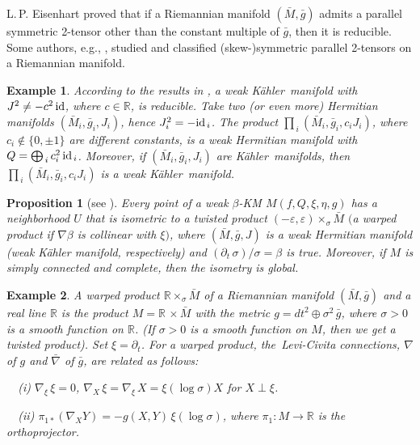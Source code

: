 \documentclass[11pt,a4paper,twoside]{article}
\newtheorem{example}{Example}%
\newtheorem{proposition}{Proposition}%
\begin{document}
{L.\,P. Eisenhart \cite{E-1923} proved that if a Riemannian manifold $(\bar M, \bar g)$ admits a pa\-rallel symmetric 2-tensor other than the constant
multiple of $\bar g$, then it is reducible.
Some authors, e.g., \cite{H-2022}, studied and classified (skew-)symmetric parallel 2-tensors on a Riemannian manifold.

\begin{example}\rm
According to the results in \cite{E-1923}, a weak K\"{a}hler~manifold with $J^2\ne -c^2\,{\rm id}$, where $c\in\mathbb{R}$, is reducible.
Take two (or even more) Hermitian manifolds $(\bar M_i,\bar g_i, J_i)$, hence $J_i^2=-{\rm id}_{\,i}$.
The product $\prod_{\,i}(\bar M_i,\bar g_i, c_i J_i)$, where $c_i\not\in\{0,\pm1\}$ are different constants, is a weak
Hermitian manifold with $Q=\bigoplus_{\,i}c_i^2\,{\rm id}_{\,i}$.
Moreover, if $(\bar M_i,\bar g_i, J_i)$ are K\"{a}hler~manifolds, then $\prod_{\,i}(\bar M_i,\bar g_i, c_i J_i)$ is a weak K\"{a}hler~manifold.
\end{example}


\begin{proposition}[see \cite{rov-126}]\label{T-2.1}
Every point of a weak $\beta$-KM $M({f},Q, \xi,\eta,g)$ has a neighborhood $U$ that is isometric to a twisted product $(-\varepsilon,\varepsilon)\times_\sigma\bar M$
$($a warped product if $\nabla\beta$ is collinear with $\xi)$, where $(\bar M,\bar g, J)$ is a weak Hermitian manifold  (weak K\"{a}hler manifold, respectively) and $(\partial_t\,\sigma)/\sigma=\beta$ is true.
Moreover, if $M$ is simply connected and complete, then the isometry is global.
\end{proposition}

\begin{example}\label{Ex-warped}\rm
A {warped product} $\mathbb{R}\times_\sigma\bar M$
of a Riemannian manifold $(\bar M,\bar g)$ and a real line $\mathbb{R}$
is the product $M=\mathbb{R}\,\times\bar M$ with the metric $g=dt^2\oplus \sigma^2\,\bar g$, where $\sigma>0$ is a smooth function on $\mathbb{R}$.
(If $\sigma>0$ is a smooth function on $M$, then we get a twisted product).
Set $\xi=\partial_t$.
For a {warped product}, the~Levi-Civita connections, $\nabla$ of $g$ and $\bar\nabla$ of $\bar g$, are related as follows:

\noindent\ \
(i) $\nabla_\xi\,\xi= 0$, $\nabla_X\,\xi=\nabla_\xi\,X= \xi(\log\sigma)X$ for $X\perp\xi$.

\noindent\ \
(ii) $\pi_{1*}(\nabla_XY) = -g(X,Y)\,\xi(\log\sigma)$, where $\pi_1: M \to\mathbb{R}$ is the orthoprojector.


\end{example}}
\end{document}
